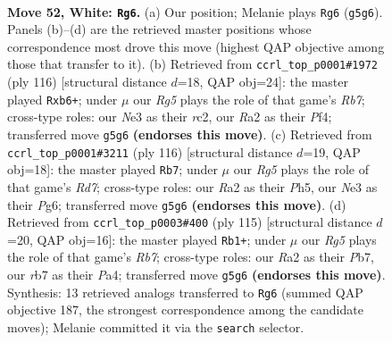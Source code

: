 \documentclass[11pt]{article}
\begin{document}
\clearpage

\begin{figure}[p]\centering
\begin{subfigure}{0.46\textwidth}\centering
\resizebox{\linewidth}{!}{%
\newchessgame
\chessboard[
  setfen={7k/1r4b1/8/6R1/2P4K/4N3/R7/8 w - - 24 52},
  showmover=false,
  pgfstyle=straightmove, color=movearrow, markmove={g5-g6}
]}
\caption{}
\end{subfigure}\hfill
\begin{subfigure}{0.46\textwidth}\centering
\resizebox{\linewidth}{!}{%
\newchessgame
\chessboard[
  setfen={8/1R2b3/1p3k2/8/5P2/6K1/2r5/8 w - - 0 59},
  showmover=false,
  pgfstyle=straightmove, color=movearrow, markmove={b7-b6}
]}
\caption{}
\end{subfigure}
\\[4pt]
\begin{subfigure}{0.46\textwidth}\centering
\resizebox{\linewidth}{!}{%
\newchessgame
\chessboard[
  setfen={4r2k/3R2b1/6P1/7P/6K1/8/8/8 w - - 15 59},
  showmover=false,
  pgfstyle=straightmove, color=movearrow, markmove={d7-b7}
]}
\caption{}
\end{subfigure}\hfill
\begin{subfigure}{0.46\textwidth}\centering
\resizebox{\linewidth}{!}{%
\newchessgame
\chessboard[
  setfen={8/1p6/8/5k2/p1bR4/P7/1r1B4/4K3 b - - 1 58},
  showmover=false,
  pgfstyle=straightmove, color=movearrow, markmove={b2-b1}
]}
\caption{}
\end{subfigure}
\caption{\textbf{Move 52, White: \texttt{Rg6}.} (a) Our position; Melanie plays \texttt{Rg6} (\texttt{g5g6}). Panels (b)--(d) are the retrieved master positions whose correspondence most drove this move (highest QAP objective among those that transfer to it). (b) Retrieved from \texttt{ccrl\_top\_p0001\#1972} (ply 116) [structural distance $d$=18, QAP obj=24]: the master played \texttt{Rxb6+}; under $\mu$ our \emph{Rg5} plays the role of that game's \emph{Rb7}; cross-type roles: our \emph{N}e3 as their \emph{r}c2, our \emph{R}a2 as their \emph{P}f4; transferred move \texttt{g5g6} \textbf{(endorses this move)}. (c) Retrieved from \texttt{ccrl\_top\_p0001\#3211} (ply 116) [structural distance $d$=19, QAP obj=18]: the master played \texttt{Rb7}; under $\mu$ our \emph{Rg5} plays the role of that game's \emph{Rd7}; cross-type roles: our \emph{R}a2 as their \emph{P}h5, our \emph{N}e3 as their \emph{P}g6; transferred move \texttt{g5g6} \textbf{(endorses this move)}. (d) Retrieved from \texttt{ccrl\_top\_p0003\#400} (ply 115) [structural distance $d$=20, QAP obj=16]: the master played \texttt{Rb1+}; under $\mu$ our \emph{Rg5} plays the role of that game's \emph{Rb7}; cross-type roles: our \emph{R}a2 as their \emph{P}b7, our \emph{r}b7 as their \emph{P}a4; transferred move \texttt{g5g6} \textbf{(endorses this move)}. Synthesis: 13 retrieved analogs transferred to \texttt{Rg6} (summed QAP objective 187, the strongest correspondence among the candidate moves); Melanie committed it via the \texttt{search} selector.}
\label{fig:thought-m102}
\end{figure}
\end{document}
